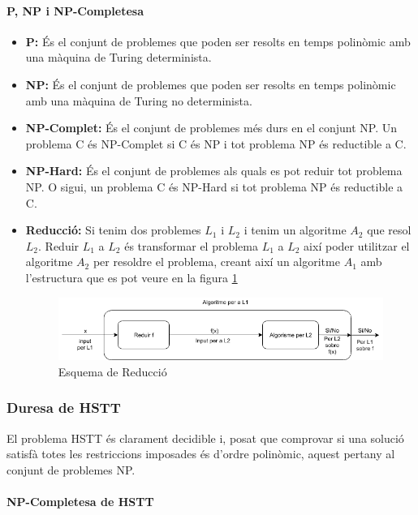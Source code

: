 \documentclass[11pt,a4paper,twoside]{report}
\begin{document}
    \paragraph*{P, NP i NP-Completesa}
    \begin{itemize}
      \item \textbf{P: }És el conjunt de problemes que poden ser resolts en temps polinòmic amb una màquina de Turing determinista. 
      \item \textbf{NP: }És el conjunt de problemes que poden ser resolts en temps polinòmic amb una màquina de Turing no determinista. 
      \item \textbf{NP-Complet: }És el conjunt de problemes més durs en el conjunt NP. Un problema C és NP-Complet si C és NP i tot problema NP és reductible a C.
      \item \textbf{NP-Hard: }És el conjunt de problemes als quals es pot reduir tot problema NP. O sigui, un problema C és NP-Hard si tot problema NP és reductible a C. 
      \item \textbf{Reducció: }Si tenim dos problemes $L_1$ i $L_2$  i tenim un algoritme $A_2$ que resol $L_2$. Reduir $L_1$ a $L_2$ és transformar el problema $L_1$ a $L_2$ així poder utilitzar el algoritme $A_2$ per resoldre el problema, creant així un algoritme $A_1$ amb l'estructura que es pot veure en la figura \ref{fig:reduccio}
      \begin{figure}[ht!]
        \includegraphics[width=\textwidth]{Diagrames/Reduccio.png}
        \caption{Esquema de Reducció}
        \label{fig:reduccio}
      \end{figure}
      
    \end{itemize}

    \subsubsection{Duresa de HSTT}
    El problema HSTT és clarament decidible i, posat que comprovar si una solució satisfà totes les restriccions imposades és d'ordre polinòmic, aquest pertany al conjunt de problemes NP.
    
    \paragraph*{NP-Completesa de HSTT} ~\\
\end{document}
